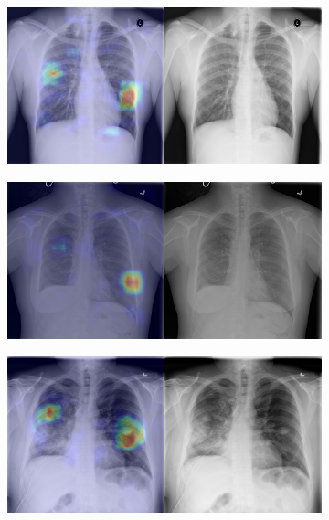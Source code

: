\begin{figure}[b]
\begin{subfigure}{0.4\textwidth}
    \end{subfigure}
    \begin{subfigure}{0.4\textwidth}
        \centering
        \includegraphics[width=1.0\textwidth]{Chapters/5. Conclusiones/img/Nodule/1_1_00001517_006.png}
    \end{subfigure}
    \begin{subfigure}{0.4\textwidth}
        \centering
        \includegraphics[width=1.0\textwidth]{Chapters/5. Conclusiones/img/Nodule/1_1_00001673_001.png}
    \end{subfigure}
    \begin{subfigure}{0.4\textwidth}
        \centering
        \includegraphics[width=1.0\textwidth]{Chapters/5. Conclusiones/img/Nodule/1_1_00025368_019.png}

\end{subfigure}
\end{figure}

